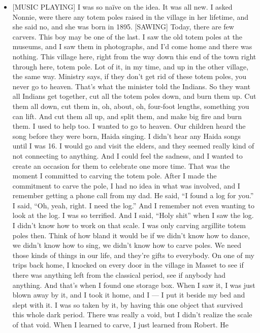 \begin{itemize}
\tightlist
\item
  {[}MUSIC PLAYING{]} I was so naïve on the idea. It was all new. I
  asked Nonnie, were there any totem poles raised in the village in her
  lifetime, and she said no, and she was born in 1895. {[}SAWING{]}
  Today, there are few carvers. This boy may be one of the last. I saw
  the old totem poles at the museums, and I saw them in photographs, and
  I'd come home and there was nothing. This village here, right from the
  way down this end of the town right through here, totem pole. Lot of
  it, in my time, and up in the other village, the same way. Ministry
  says, if they don't get rid of these totem poles, you never go to
  heaven. That's what the minister told the Indians. So they want all
  Indians get together, cut all the totem poles down, and burn them up.
  Cut them all down, cut them in, oh, about, oh, four-foot lengths,
  something you can lift. And cut them all up, and split them, and make
  big fire and burn them. I used to help too. I wanted to go to heaven.
  Our children heard the song before they were born, Haida singing. I
  didn't hear any Haida songs until I was 16. I would go and visit the
  elders, and they seemed really kind of not connecting to anything. And
  I could feel the sadness, and I wanted to create an occasion for them
  to celebrate one more time. That was the moment I committed to carving
  the totem pole. After I made the commitment to carve the pole, I had
  no idea in what was involved, and I remember getting a phone call from
  my dad. He said, ``I found a log for you.'' I said, ``Oh, yeah, right.
  I need the log.'' And I remember not even wanting to look at the log.
  I was so terrified. And I said, ``Holy shit'' when I saw the log. I
  didn't know how to work on that scale. I was only carving argillite
  totem poles then. Think of how bland it would be if we didn't know how
  to dance, we didn't know how to sing, we didn't know how to carve
  poles. We need those kinds of things in our life, and they're gifts to
  everybody. On one of my trips back home, I knocked on every door in
  the village in Masset to see if there was anything left from the
  classical period, see if anybody had anything. And that's when I found
  one storage box. When I saw it, I was just blown away by it, and I
  took it home, and I --- I put it beside my bed and slept with it. I
  was so taken by it, by having this one object that survived this whole
  dark period. There was really a void, but I didn't realize the scale
  of that void. When I learned to carve, I just learned from Robert. He

\end{itemize}
